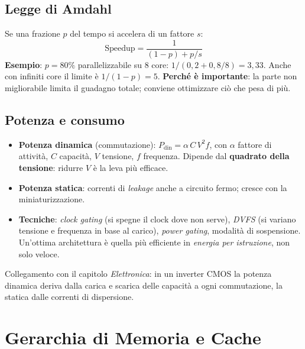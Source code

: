 \subsection{Legge di Amdahl}
Se una frazione $p$ del tempo si accelera di un fattore $s$:
\[
\text{Speedup} = \frac{1}{(1-p) + p/s}
\]
\textbf{Esempio}: $p = 80\%$ parallelizzabile su $8$ core: $1/(0{,}2 + 0{,}8/8) = 3{,}33$. Anche con infiniti core il limite è $1/(1-p) = 5$. \textbf{Perché è importante}: la parte non migliorabile limita il guadagno totale; conviene ottimizzare ciò che pesa di più.

\subsection{Potenza e consumo}
\begin{itemize}
    \item \textbf{Potenza dinamica} (commutazione): $P_{\text{din}} = \alpha\, C\, V^2 f$, con $\alpha$ fattore di attività, $C$ capacità, $V$ tensione, $f$ frequenza. Dipende dal \textbf{quadrato della tensione}: ridurre $V$ è la leva più efficace.
    \item \textbf{Potenza statica}: correnti di \emph{leakage} anche a circuito fermo; cresce con la miniaturizzazione.
    \item \textbf{Tecniche}: \emph{clock gating} (si spegne il clock dove non serve), \emph{DVFS} (si variano tensione e frequenza in base al carico), \emph{power gating}, modalità di sospensione. Un'ottima architettura è quella più efficiente in \emph{energia per istruzione}, non solo veloce.
\end{itemize}
Collegamento con il capitolo \emph{Elettronica}: in un inverter CMOS la potenza dinamica deriva dalla carica e scarica delle capacità a ogni commutazione, la statica dalle correnti di dispersione.

\section{Gerarchia di Memoria e Cache}

